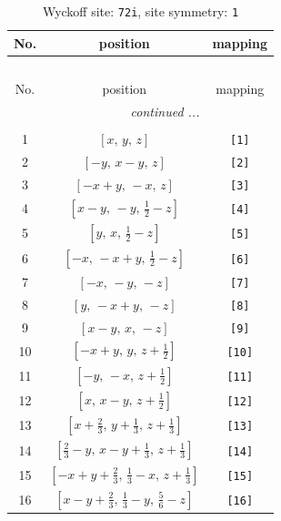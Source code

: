 \documentclass[fleqn,8pt]{jsarticle}
\begin{document}
\begin{longtable}{ccc}
\caption{Wyckoff site: {\tt 72i}, site symmetry: {\tt 1}}
 \\
 \hline \hline
No. & position & mapping \\ \hline \endfirsthead

\multicolumn{2}{l}{\tablename\ \thetable{}} \\
 \hline \hline
No. & position & mapping \\ \hline \endhead

 \hline \hline
\multicolumn{2}{r}{\footnotesize\it continued ...} \\ \endfoot

 \hline \hline
\multicolumn{2}{r}{} \\ \endlastfoot

1 & $\left[ x,\, y,\, z \right]$ & {\tt [1]} \\ \hline
2 & $\left[ - y,\, x - y,\, z \right]$ & {\tt [2]} \\ \hline
3 & $\left[ - x + y,\, - x,\, z \right]$ & {\tt [3]} \\ \hline
4 & $\left[ x - y,\, - y,\, \frac{1}{2} - z \right]$ & {\tt [4]} \\ \hline
5 & $\left[ y,\, x,\, \frac{1}{2} - z \right]$ & {\tt [5]} \\ \hline
6 & $\left[ - x,\, - x + y,\, \frac{1}{2} - z \right]$ & {\tt [6]} \\ \hline
7 & $\left[ - x,\, - y,\, - z \right]$ & {\tt [7]} \\ \hline
8 & $\left[ y,\, - x + y,\, - z \right]$ & {\tt [8]} \\ \hline
9 & $\left[ x - y,\, x,\, - z \right]$ & {\tt [9]} \\ \hline
10 & $\left[ - x + y,\, y,\, z + \frac{1}{2} \right]$ & {\tt [10]} \\ \hline
11 & $\left[ - y,\, - x,\, z + \frac{1}{2} \right]$ & {\tt [11]} \\ \hline
12 & $\left[ x,\, x - y,\, z + \frac{1}{2} \right]$ & {\tt [12]} \\ \hline
13 & $\left[ x + \frac{2}{3},\, y + \frac{1}{3},\, z + \frac{1}{3} \right]$ & {\tt [13]} \\ \hline
14 & $\left[ \frac{2}{3} - y,\, x - y + \frac{1}{3},\, z + \frac{1}{3} \right]$ & {\tt [14]} \\ \hline
15 & $\left[ - x + y + \frac{2}{3},\, \frac{1}{3} - x,\, z + \frac{1}{3} \right]$ & {\tt [15]} \\ \hline
16 & $\left[ x - y + \frac{2}{3},\, \frac{1}{3} - y,\, \frac{5}{6} - z \right]$ & {\tt [16]} \\ \hline

\end{longtable}
\end{document}

